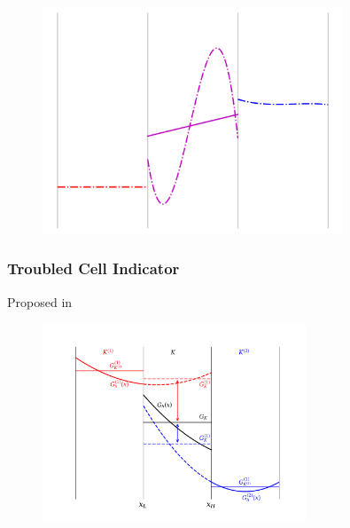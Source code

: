 \documentclass{beamer}
\begin{document}
\begin{frame}
\begin{figure}
\begin{overprint}
        \centering\includegraphics[width=0.8\textwidth]{./fig.sl_07.png}
    \end{overprint}
  \end{figure}

\end{frame}

\begin{frame}
\frametitle{Troubled Cell Indicator}

  Proposed in \citet{fs2017}

  \begin{figure}[htb!]
    \centering
    \includegraphics[width=0.7\textwidth]{fig.TCI.png}
  \end{figure}

\end{frame}
\end{document}
